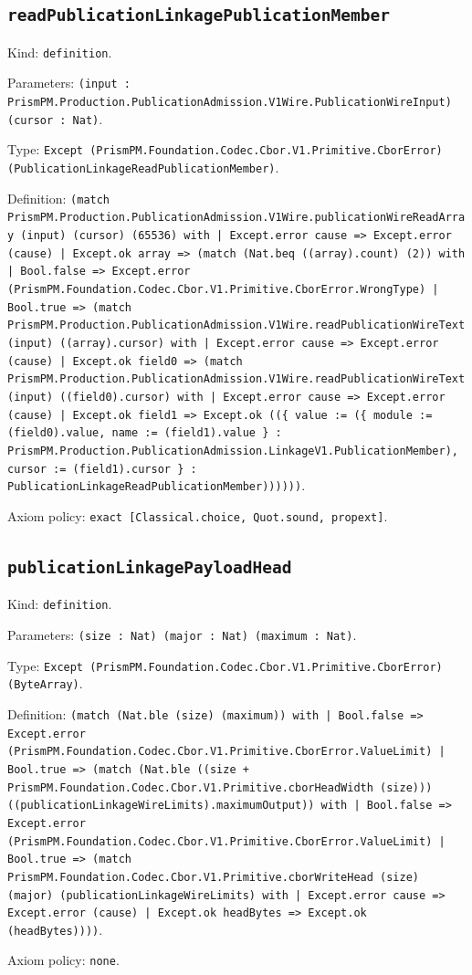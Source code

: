 \documentclass[11pt]{article}
\begin{document}
\subsection*{\texttt{readPublicationLinkagePublicationMember}}
\noindent Kind: \texttt{definition}.\par
\noindent Parameters: \texttt{(input : PrismPM.Production.PublicationAdmission.V1Wire.PublicationWireInput) (cursor : Nat)}.\par
\noindent Type: \texttt{Except (PrismPM.Foundation.Codec.Cbor.V1.Primitive.CborError) (PublicationLinkageReadPublicationMember)}.\par
\noindent Definition: \texttt{(match PrismPM.Production.PublicationAdmission.V1Wire.publicationWireReadArray (input) (cursor) (65536) with | Except.error cause => Except.error (cause) | Except.ok array => (match (Nat.beq ((array).count) (2)) with | Bool.false => Except.error (PrismPM.Foundation.Codec.Cbor.V1.Primitive.CborError.WrongType) | Bool.true => (match PrismPM.Production.PublicationAdmission.V1Wire.readPublicationWireText (input) ((array).cursor) with | Except.error cause => Except.error (cause) | Except.ok field0 => (match PrismPM.Production.PublicationAdmission.V1Wire.readPublicationWireText (input) ((field0).cursor) with | Except.error cause => Except.error (cause) | Except.ok field1 => Except.ok ((\{ value := (\{ module := (field0).value, name := (field1).value \} : PrismPM.Production.PublicationAdmission.LinkageV1.PublicationMember), cursor := (field1).cursor \} : PublicationLinkageReadPublicationMember))))))}.\par
\noindent Axiom policy: \texttt{exact [Classical.choice, Quot.sound, propext]}.\par
\subsection*{\texttt{publicationLinkagePayloadHead}}
\noindent Kind: \texttt{definition}.\par
\noindent Parameters: \texttt{(size : Nat) (major : Nat) (maximum : Nat)}.\par
\noindent Type: \texttt{Except (PrismPM.Foundation.Codec.Cbor.V1.Primitive.CborError) (ByteArray)}.\par
\noindent Definition: \texttt{(match (Nat.ble (size) (maximum)) with | Bool.false => Except.error (PrismPM.Foundation.Codec.Cbor.V1.Primitive.CborError.ValueLimit) | Bool.true => (match (Nat.ble ((size + PrismPM.Foundation.Codec.Cbor.V1.Primitive.cborHeadWidth (size))) ((publicationLinkageWireLimits).maximumOutput)) with | Bool.false => Except.error (PrismPM.Foundation.Codec.Cbor.V1.Primitive.CborError.ValueLimit) | Bool.true => (match PrismPM.Foundation.Codec.Cbor.V1.Primitive.cborWriteHead (size) (major) (publicationLinkageWireLimits) with | Except.error cause => Except.error (cause) | Except.ok headBytes => Except.ok (headBytes))))}.\par
\noindent Axiom policy: \texttt{none}.\par
\end{document}
